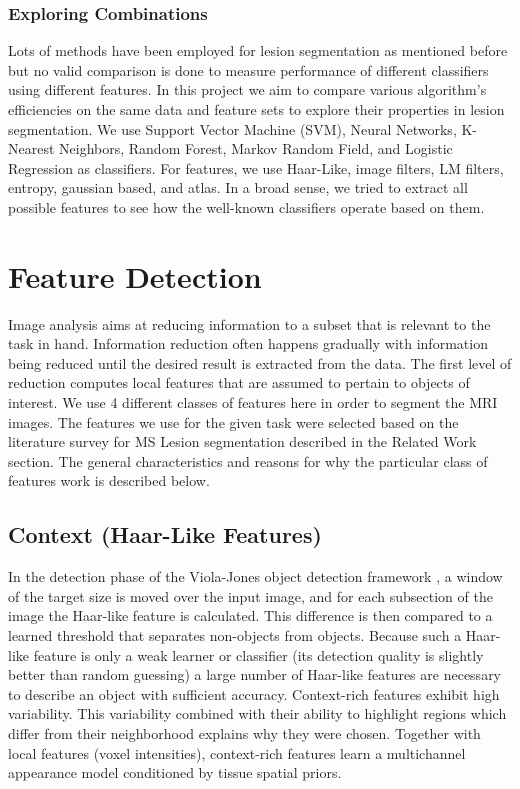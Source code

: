 \documentclass{article} %
\begin{document}
\subsubsection{ Exploring Combinations }
Lots of methods have been employed for lesion segmentation as mentioned before but no valid comparison is done to measure performance of different classifiers using different features. In this project we aim to compare various algorithm's efficiencies on the same data and feature sets to explore their properties in  lesion segmentation. We use Support Vector Machine (SVM), Neural Networks, K-Nearest Neighbors, Random Forest, Markov Random Field, and Logistic Regression as classifiers. For features, we use Haar-Like, image filters, LM filters, entropy, gaussian based, and atlas. In a broad sense, we tried to extract all possible features to see how the well-known classifiers operate based on them.

\section{Feature Detection}
Image analysis aims at reducing information to a subset that is relevant to the task in hand. Information reduction often happens gradually with information being reduced until the desired result is extracted from the data. \cite{toennies2012guide} The first level of reduction computes local features that are assumed to pertain to objects of interest. We use 4 different classes of features here in order to segment the MRI images. The features we use for the given task were selected based on the literature survey for MS Lesion segmentation described in the Related Work section. The general characteristics and reasons for why the particular class of features work is described below.  

\subsection{Context (Haar-Like Features)}
In the detection phase of the Viola-Jones object detection framework \cite{Viola-Jones}, a window of the target size is moved over the input image, and for each subsection of the image the Haar-like feature is calculated. This difference is then compared to a learned threshold that separates non-objects from objects. Because such a Haar-like feature is only a weak learner or classifier (its detection quality is slightly better than random guessing) a large number of Haar-like features are necessary to describe an object with sufficient accuracy. Context-rich features exhibit high variability. This variability combined with their ability to highlight regions which differ from their neighborhood explains why they were chosen. Together with local features (voxel intensities), context-rich features learn a multichannel appearance model conditioned by tissue spatial priors.\cite{geremia2011spatial}
\end{document}
